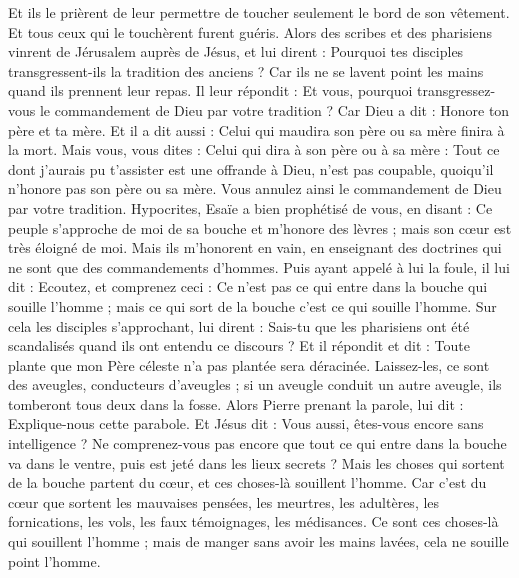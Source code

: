 \begin{multicols}{2}
Et ils le prièrent de leur permettre de toucher seulement le bord de son vêtement. Et tous ceux qui le touchèrent furent guéris.
\VerseOne{}Alors des scribes et des pharisiens vinrent de Jérusalem auprès de Jésus, et lui dirent :
Pourquoi tes disciples transgressent-ils la tradition des anciens ? Car ils ne se lavent point les mains quand ils prennent leur repas.
Il leur répondit : Et vous, pourquoi transgressez-vous le commandement de Dieu par votre tradition ?
Car Dieu a dit : Honore ton père et ta mère. Et il a dit aussi : Celui qui maudira son père ou sa mère finira à la mort.
Mais vous, vous dites : Celui qui dira à son père ou à sa mère : Tout ce dont j'aurais pu t'assister est une offrande à Dieu, n'est pas coupable, quoiqu'il n'honore pas son père ou sa mère.
Vous annulez ainsi le commandement de Dieu par votre tradition.
Hypocrites, Esaïe a bien prophétisé de vous, en disant :
Ce peuple s'approche de moi de sa bouche et m'honore des lèvres ; mais son cœur est très éloigné de moi.
 Mais ils m'honorent en vain, en enseignant des doctrines qui ne sont que des commandements d'hommes.
Puis ayant appelé à lui la foule, il lui dit : Ecoutez, et comprenez ceci :
Ce n'est pas ce qui entre dans la bouche qui souille l'homme ; mais ce qui sort de la bouche c'est ce qui souille l'homme.
Sur cela les disciples s'approchant, lui dirent : Sais-tu que les pharisiens ont été scandalisés quand ils ont entendu ce discours ?
Et il répondit et dit : Toute plante que mon Père céleste n'a pas plantée sera déracinée.
Laissez-les, ce sont des aveugles, conducteurs d'aveugles ; si un aveugle conduit un autre aveugle, ils tomberont tous deux dans la fosse.
Alors Pierre prenant la parole, lui dit : Explique-nous cette parabole.
Et Jésus dit : Vous aussi, êtes-vous encore sans intelligence ?
Ne comprenez-vous pas encore que tout ce qui entre dans la bouche va dans le ventre, puis est jeté dans les lieux secrets ?
Mais les choses qui sortent de la bouche partent du cœur, et ces choses-là souillent l'homme.
Car c'est du cœur que sortent les mauvaises pensées, les meurtres, les adultères, les fornications, les vols, les faux témoignages, les médisances.
Ce sont ces choses-là qui souillent l'homme ; mais de manger sans avoir les mains lavées, cela ne souille point l'homme.

\end{multicols}
